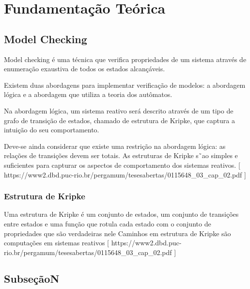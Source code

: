 \section{Fundamentação Teórica}

\subsection{Model Checking}
Model checking é uma técnica que verifica propriedades de um sistema através de enumeração exaustiva de todos os estados alcançáveis.

Existem duas abordagens para implementar verificação de modelos: a abordagem lógica e a abordagem
que utiliza a teoria dos autômatos.

Na abordagem lógica, um sistema reativo será descrito através de um tipo de
grafo de transição de estados, chamado de estrutura de Kripke, que captura
a intuição do seu comportamento.

Deve-se ainda considerar que existe uma restrição na abordagem lógica: as relações de
transições devem ser totais. As estruturas de Kripke s˜ao simples e suficientes
para capturar os aspectos de comportamento dos sistemas reativos.
[ https://www2.dbd.puc-rio.br/pergamum/tesesabertas/0115648\_03\_cap\_02.pdf ]

\subsubsection{Estrutura de Kripke}
Uma estrutura de Kripke é um conjunto de estados, um conjunto de transições entre estados e uma função que rotula cada estado com o conjunto de propriedades que são verdadeiras nele
Caminhos em estrutura de Kripke são computações em sistemas reativos
[ https://www2.dbd.puc-rio.br/pergamum/tesesabertas/0115648\_03\_cap\_02.pdf ]

\subsection{SubseçãoN}
   